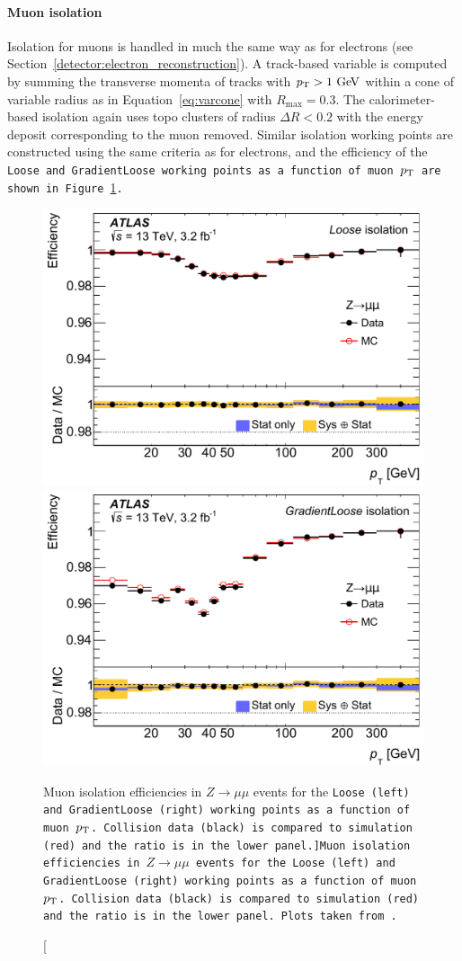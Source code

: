 \paragraph*{Muon isolation}
Isolation for muons is handled in much the same way as for electrons (see Section~\ref{detector:electron_reconstruction}).
A track-based variable is computed by summing the transverse momenta of tracks with $\pt > 1\gev$ within a cone of variable radius as in Equation~\ref{eq:varcone} with $R_\textrm{max} = 0.3$.
The calorimeter-based isolation again uses topo clusters of radius $\Delta R < 0.2$ with the energy deposit corresponding to the muon removed.
Similar isolation working points are constructed using the same criteria as for electrons, and the efficiency of the \tt{Loose} and \tt{GradientLoose} working points as a function of muon $p_{\mathrm{T}}$ are shown in Figure~\ref{fig:muon_iso_efficiency}.

\begin{figure}[htbp]
  \centering
  \includegraphics[width=.48\textwidth]{figs/detector/muon_iso_efficiency_loose-cropped}
  \includegraphics[width=.48\textwidth]{figs/detector/muon_iso_efficiency_gloose-cropped}
  \caption[Muon isolation efficiencies in $Z\rightarrow\mu\mu$ events for the \tt{Loose} (left) and \tt{GradientLoose} (right) working points as a function of muon $p_{\mathrm{T}}$.  Collision data (black) is compared to simulation (red) and the ratio is in the lower panel.]{Muon isolation efficiencies in $Z\rightarrow\mu\mu$ events for the \tt{Loose} (left) and \tt{GradientLoose} (right) working points as a function of muon $p_{\mathrm{T}}$.  Collision data (black) is compared to simulation (red) and the ratio is in the lower panel.  Plots taken from~\cite{2016.muon-reconstruction-13tev}.}
  \label{fig:muon_iso_efficiency}
\end{figure}


